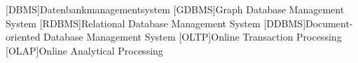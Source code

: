 
\begin{acronym}[Abkürzungsverzeichnis]
	[DBMS]{Datenbankmanagementsystem}
	[GDBMS]{Graph Database Management System}
	[RDBMS]{Relational Database Management System}
	[DDBMS]{Document-oriented Database Management System}
	[OLTP]{Online Transaction Processing}
	[OLAP]{Online Analytical Processing}
\end{acronym}